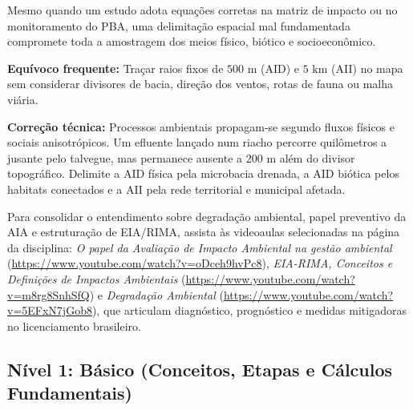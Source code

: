 
Mesmo quando um estudo adota equações corretas na matriz de impacto ou no monitoramento do PBA, uma delimitação espacial mal fundamentada compromete toda a amostragem dos meios físico, biótico e socioeconômico.

\begin{boxErro}
  \textbf{Equívoco frequente:} Traçar raios fixos de $500\text{ m}$ (AID) e $5\text{ km}$ (AII) no mapa sem considerar divisores de bacia, direção dos ventos, rotas de fauna ou malha viária.\par
  \textbf{Correção técnica:} Processos ambientais propagam-se segundo fluxos físicos e sociais anisotrópicos. Um efluente lançado num riacho percorre quilômetros a jusante pelo talvegue, mas permanece ausente a $200\text{ m}$ além do divisor topográfico. Delimite a AID física pela microbacia drenada, a AID biótica pelos habitats conectados e a AII pela rede territorial e municipal afetada.
\end{boxErro}

Para consolidar o entendimento sobre degradação ambiental, papel preventivo da AIA e estruturação de EIA/RIMA, assista às videoaulas selecionadas na página da disciplina: \textit{O papel da Avaliação de Impacto Ambiental na gestão ambiental} (\url{https://www.youtube.com/watch?v=oDceh9hvPc8}), \textit{EIA-RIMA, Conceitos e Definições de Impactos Ambientais} (\url{https://www.youtube.com/watch?v=m8rg8SnhSfQ}) e \textit{Degradação Ambiental} (\url{https://www.youtube.com/watch?v=5EFxN7jGob8}), que articulam diagnóstico, prognóstico e medidas mitigadoras no licenciamento brasileiro.


\subsection*{Nível 1: Básico (Conceitos, Etapas e Cálculos Fundamentais)}


